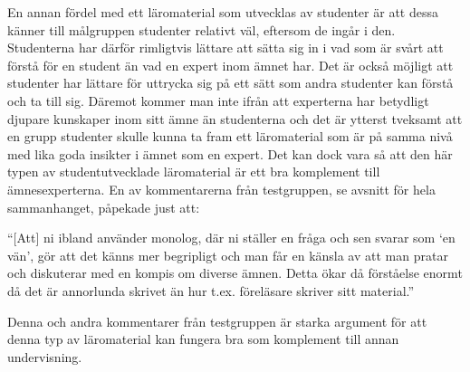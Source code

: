 \documentclass[12pt,a4paper,twoside,openright]{article}
\begin{document}
En annan fördel med ett läromaterial som utvecklas av studenter är att
dessa känner till målgruppen studenter relativt väl, eftersom de ingår
i den. Studenterna har därför rimligtvis lättare att sätta sig in i
vad som är svårt att förstå för en student än vad en expert inom ämnet
har. Det är också möjligt att studenter har lättare för uttrycka sig
på ett sätt som andra studenter kan förstå och ta till sig. Däremot
kommer man inte ifrån att experterna har betydligt djupare kunskaper
inom sitt ämne än studenterna och det är ytterst tveksamt att en grupp
studenter skulle kunna ta fram ett läromaterial som är på samma nivå
med lika goda insikter i ämnet som en expert. Det kan dock vara så att
den här typen av studentutvecklade läromaterial är ett bra komplement
till ämnesexperterna. En av kommentarerna från testgruppen, se avsnitt
 för hela sammanhanget, påpekade just att:

\begin{displayquote}
  ``[Att] ni ibland använder monolog, där ni ställer en fråga och sen
  svarar som `en vän', gör att det känns mer begripligt och man får en
  känsla av att man pratar och diskuterar med en kompis om diverse
  ämnen. Detta ökar då förståelse enormt då det är annorlunda skrivet än
  hur t.ex. föreläsare skriver sitt material.''
\end{displayquote}

Denna och andra kommentarer från testgruppen är starka argument för
att denna typ av läromaterial kan fungera bra som komplement till
annan undervisning.


\end{document}
